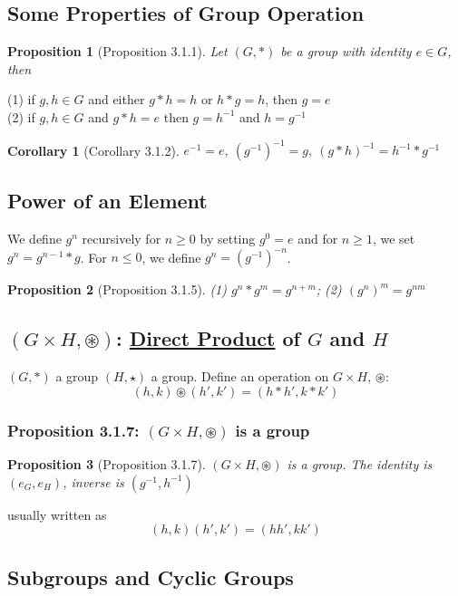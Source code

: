 \documentclass[11pt,a4paper]{article}
\newtheorem{proposition}{Proposition}
\newtheorem{corollary}{Corollary}
\begin{document}
\subsection{Some Properties of Group Operation}
\begin{proposition}[Proposition 3.1.1]
    Let $(G,*)$ be a group with identity $e\in G$, then
\end{proposition}
(1) if $g,h\in G$ and either $g*h=h$ or $h*g=h$, then $g=e$\\
(2) if $g,h\in G$ and $g*h=e$ then $g=h^{-1}$ and $h=g^{-1}$

\begin{corollary}[Corollary 3.1.2]
    $e^{-1}=e,\ (g^{-1})^{-1}=g,\ (g*h)^{-1}=h^{-1}*g^{-1}$
\end{corollary}


\subsection{Power of an Element}
We define $g^n$ recursively for $n \geq 0$ by setting $g^0 = e$ and for $n\geq 1$, we set $g^n = g^{n−1} * g$. For $n \leq 0$, we define $g^n = (g^{−1})^{-n}$.
\begin{proposition}[Proposition 3.1.5]
(1) $g^n*g^m=g^{n+m}$; (2) $(g^n)^m=g^{nm}$
\end{proposition}

\subsection{$(G\times H, \circledast)$: \underline{Direct Product} of $G$ and $H$}
$(G,*)$ a group $(H,\star)$ a group. Define an operation on $G\times H$, $\circledast$:\\
$$(h,k)\circledast(h',k')=(h*h',k*k')$$
\subsubsection{Proposition 3.1.7: $(G\times H, \circledast)$ is a group}
\begin{proposition}[Proposition 3.1.7]
$(G\times H, \circledast)$ is a group. The identity is $(e_G,e_H)$, inverse is $(g^{-1},h^{-1})$
\end{proposition}
usually written as
$$(h,k)(h',k')=(hh',kk')$$

\subsection{Subgroups and Cyclic Groups}
\end{document}
